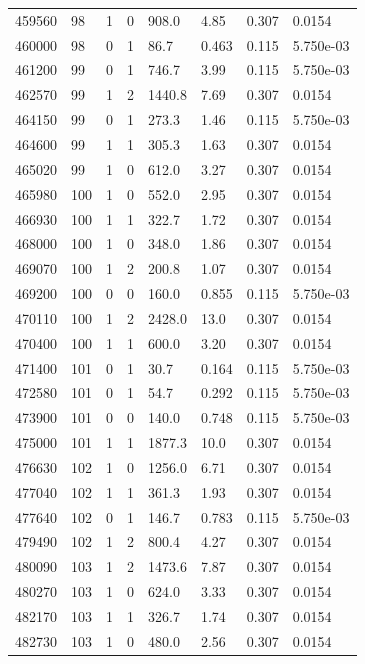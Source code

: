 \documentclass[preview]{standalone}
\begin{document}
{{{{{{{{{{{{\begin{tabular}{L{1.2cm}C{1.2cm} C{0.3cm}C{0.5cm} C{1.4cm}C{1.4cm} C{1.4cm}C{1.4cm}}
  459560  &    98  & 1     &  0 &  908.0  & 4.85  & 0.307 &  0.0154   \\ 
  460000  &    98  & 0     &  1 &  86.7  & 0.463  & 0.115 &  5.750e-03   \\ 
  461200  &    99  & 0     &  1 &  746.7  & 3.99  & 0.115 &  5.750e-03   \\ 
  462570  &    99  & 1     &  2 &  1440.8  & 7.69  & 0.307 &  0.0154   \\ 
  464150  &    99  & 0     &  1 &  273.3  & 1.46  & 0.115 &  5.750e-03   \\ 
  464600  &    99  & 1     &  1 &  305.3  & 1.63  & 0.307 &  0.0154   \\ 
  465020  &    99  & 1     &  0 &  612.0  & 3.27  & 0.307 &  0.0154   \\ 
  465980  &   100  & 1     &  0 &  552.0  & 2.95  & 0.307 &  0.0154   \\ 
  466930  &   100  & 1     &  1 &  322.7  & 1.72  & 0.307 &  0.0154   \\ 
  468000  &   100  & 1     &  0 &  348.0  & 1.86  & 0.307 &  0.0154   \\ 
  469070  &   100  & 1     &  2 &  200.8  & 1.07  & 0.307 &  0.0154   \\ 
  469200  &   100  & 0     &  0 &  160.0  & 0.855  & 0.115 &  5.750e-03   \\ 
  470110  &   100  & 1     &  2 &  2428.0  & 13.0  & 0.307 &  0.0154   \\ 
  470400  &   100  & 1     &  1 &  600.0  & 3.20  & 0.307 &  0.0154   \\ 
  471400  &   101  & 0     &  1 &  30.7  & 0.164  & 0.115 &  5.750e-03   \\ 
  472580  &   101  & 0     &  1 &  54.7  & 0.292  & 0.115 &  5.750e-03   \\ 
  473900  &   101  & 0     &  0 &  140.0  & 0.748  & 0.115 &  5.750e-03   \\ 
  475000  &   101  & 1     &  1 &  1877.3  & 10.0  & 0.307 &  0.0154   \\ 
  476630  &   102  & 1     &  0 &  1256.0  & 6.71  & 0.307 &  0.0154   \\ 
  477040  &   102  & 1     &  1 &  361.3  & 1.93  & 0.307 &  0.0154   \\ 
  477640  &   102  & 0     &  1 &  146.7  & 0.783  & 0.115 &  5.750e-03   \\ 
  479490  &   102  & 1     &  2 &  800.4  & 4.27  & 0.307 &  0.0154   \\ 
  480090  &   103  & 1     &  2 &  1473.6  & 7.87  & 0.307 &  0.0154   \\ 
  480270  &   103  & 1     &  0 &  624.0  & 3.33  & 0.307 &  0.0154   \\ 
  482170  &   103  & 1     &  1 &  326.7  & 1.74  & 0.307 &  0.0154   \\ 
  482730  &   103  & 1     &  0 &  480.0  & 2.56  & 0.307 &  0.0154   \\ 
\hline 
\end{tabular} 

}}}}}}}}}}}}
\end{document}
